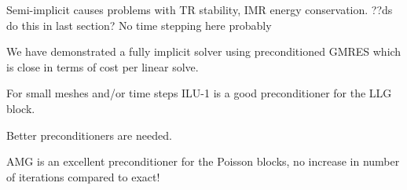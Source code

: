 Semi-implicit causes problems with TR stability, IMR energy conservation. ??ds do this in last section? No time stepping here probably

We have demonstrated a fully implicit solver using preconditioned GMRES which is close in terms of cost per linear solve.

For small meshes and/or time steps ILU-1 is a good preconditioner for the LLG block.

Better preconditioners are needed.

AMG is an excellent preconditioner for the Poisson blocks, no increase in number of iterations compared to exact!



